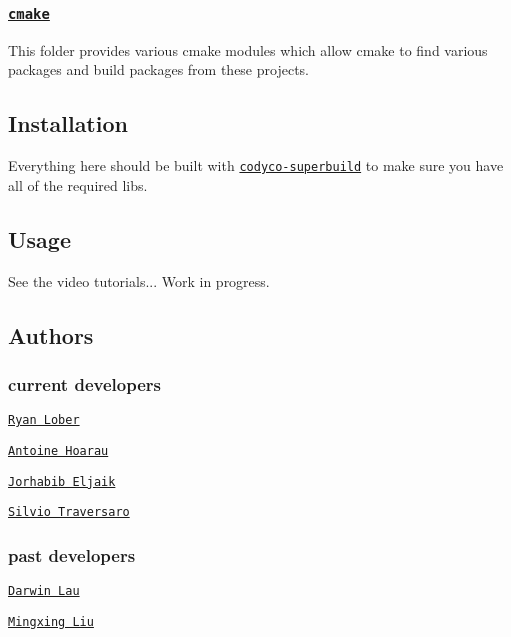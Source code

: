 \subsubsection*{\href{https://github.com/ocra-recipes/ocra-wbi-plugins/tree/master/cmake}{\tt cmake}}

This folder provides various cmake modules which allow cmake to find various packages and build packages from these projects.

\subsection*{Installation}

Everything here should be built with \href{https://github.com/robotology/codyco-superbuild}{\tt {\ttfamily codyco-\/superbuild}} to make sure you have all of the required libs.

\subsection*{Usage}

See the video tutorials... Work in progress.

\subsection*{Authors}

\subsubsection*{current developers}


\begin{DoxyItemize}
\item \href{https://github.com/rlober}{\tt Ryan Lober}
\item \href{https://github.com/ahoarau}{\tt Antoine Hoarau}
\item \href{https://github.com/jeljaik}{\tt Jorhabib Eljaik}
\item \href{https://github.com/traversaro}{\tt Silvio Traversaro}
\end{DoxyItemize}

\subsubsection*{past developers}


\begin{DoxyItemize}
\item \href{https://github.com/darwinlau}{\tt Darwin Lau}
\item \href{https://github.com/mingxing-liu}{\tt Mingxing Liu} 
\end{DoxyItemize}